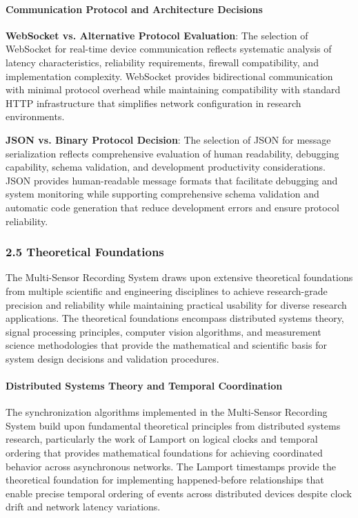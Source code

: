 \documentclass[12pt,a4paper]{report}
\begin{document}
\paragraph{Communication Protocol and Architecture Decisions}

\textbf{WebSocket vs. Alternative Protocol Evaluation}: The selection of WebSocket for real-time device communication
reflects systematic analysis of latency characteristics, reliability requirements, firewall compatibility, and
implementation complexity. WebSocket provides bidirectional communication with minimal protocol overhead while
maintaining compatibility with standard HTTP infrastructure that simplifies network configuration in research
environments.

\textbf{JSON vs. Binary Protocol Decision}: The selection of JSON for message serialization reflects comprehensive evaluation
of human readability, debugging capability, schema validation, and development productivity considerations. JSON
provides human-readable message formats that facilitate debugging and system monitoring while supporting comprehensive
schema validation and automatic code generation that reduce development errors and ensure protocol reliability.

\subsubsection{2.5 Theoretical Foundations}

The Multi-Sensor Recording System draws upon extensive theoretical foundations from multiple scientific and engineering
disciplines to achieve research-grade precision and reliability while maintaining practical usability for diverse
research applications. The theoretical foundations encompass distributed systems theory, signal processing principles,
computer vision algorithms, and measurement science methodologies that provide the mathematical and scientific basis for
system design decisions and validation procedures.

\paragraph{Distributed Systems Theory and Temporal Coordination}

The synchronization algorithms implemented in the Multi-Sensor Recording System build upon fundamental theoretical
principles from distributed systems research, particularly the work of Lamport on logical clocks and temporal ordering
that provides mathematical foundations for achieving coordinated behavior across asynchronous networks. The Lamport
timestamps provide the theoretical foundation for implementing happened-before relationships that enable precise
temporal ordering of events across distributed devices despite clock drift and network latency variations.
\end{document}
